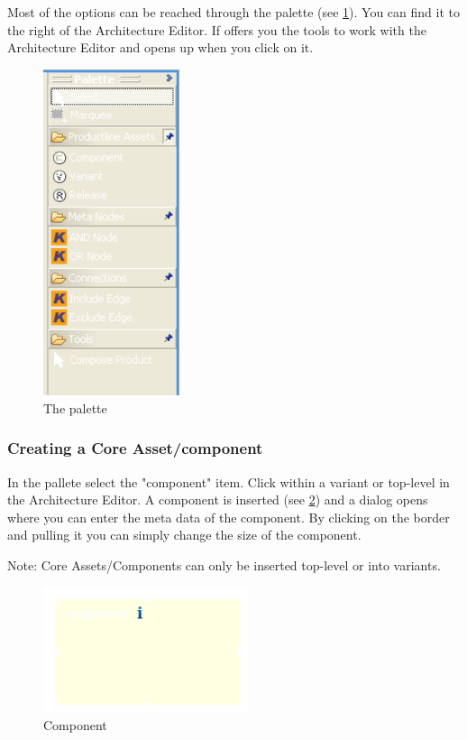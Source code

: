 Most of the options can be reached through the palette (see \ref{palette}).
You can find it to the right of the Architecture Editor. If offers you the tools
to work with the Architecture Editor and opens up when you click on it.

\begin{figure}[h!]
\begin{center}
\includegraphics[width=4cm]{palette.png}
   \caption{The palette}
\label{palette}
\end{center}
\end{figure}\par


\subsubsection{Creating a Core Asset/component}

In the pallete select the "component" item. Click within a variant or top-level in 
the Architecture Editor. A component is inserted (see \ref{component}) and a dialog opens where you can enter the meta data of
the component. By clicking on the border and pulling it you can simply change the size of the component. \par
Note: Core Assets/Components can only be inserted top-level or into variants.

\begin{figure}[h!]
\begin{center}
\includegraphics[width=6cm]{component.png}
   \caption{Component}
\label{component}
\end{center}
\end{figure}\par

